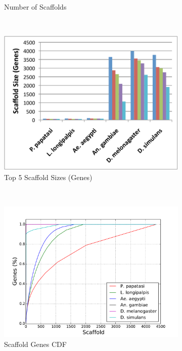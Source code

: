 \begin{figure}[H]
\begin{subfigure}[b]{0.45\textwidth}
    \caption{Number of Scaffolds}
    \label{fig:number-scaffolds}
  \end{subfigure}
  ~
  \begin{subfigure}[b]{0.45\textwidth}
    \includegraphics[width=\textwidth]{figures/synteny/top5_scaffold_sizes.pdf}
    \caption{Top 5 Scaffold Sizes (Genes)}
  \end{subfigure}
  ~
  \begin{subfigure}[b]{0.45\textwidth}
    \includegraphics[width=\textwidth]{figures/synteny/gene_scaffold_cdf.pdf}
    \caption{Scaffold Genes CDF}
  \end{subfigure}
  \caption{}
  \label{fig:scaffolds}
\end{figure}

